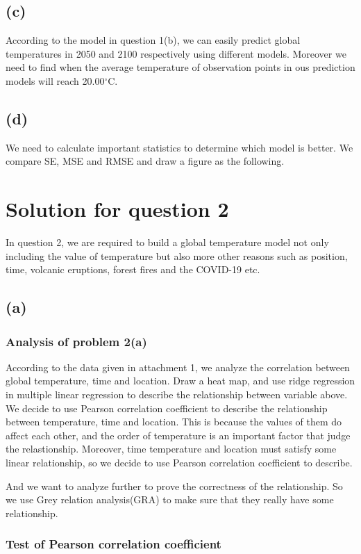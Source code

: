 \documentclass{apmcmthesis}
\def\oc{$^{\circ}$C\;}
\begin{document}
\subsection{(c)}
According to the model in question 1(b), we can easily predict global temperatures in 2050 and 2100 respectively using different models. 
Moreover we need to find when the average temperature of observation points in ous prediction models will reach 20.00\oc.

\subsection{(d)}
We need to calculate important statistics to determine which model is better. 
We compare SE, MSE and RMSE and draw a figure as the following.


\section{Solution for question 2}
In question 2, we are required to build a global temperature model not only including the value of temperature 
but also more other reasons such as position, time, volcanic eruptions, forest fires and the COVID-19 etc.

\subsection{(a)}
\subsubsection{Analysis of problem 2(a)}
According to the data given in attachment 1, we analyze the correlation between  global temperature, time and location.
Draw a heat map, and use ridge regression in multiple linear regression to describe the relationship between variable above.
We decide to use Pearson correlation coefficient to describe the relationship between temperature, time and location.
This is because the values of them do affect each other, and the order of temperature is an important factor that judge the relastionship. 
Moreover, time temperature and location must satisfy some linear relationship, so we decide to use Pearson correlation coefficient to describe. 

And we want to analyze further to prove the correctness of the relationship. 
So we use Grey relation analysis(GRA) to make sure that they really have some relationship.

\subsubsection{Test of Pearson correlation coefficient}
\end{document}
